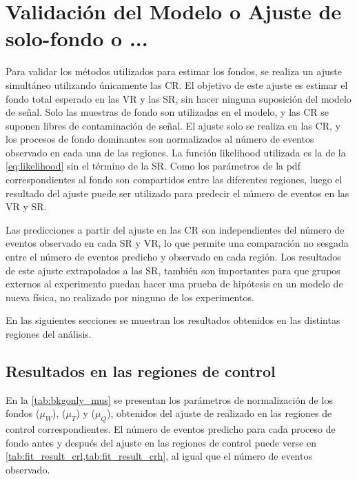 \section{Validación del Modelo o Ajuste de solo-fondo o ...} \label{sec:bkgonlyfit}

Para validar  los métodos utilizados para estimar los
fondos, se realiza un ajuste simultáneo utilizando únicamente las CR.
El objetivo de este ajuste es estimar el fondo total esperado en las VR y las
SR, sin hacer ninguna suposición del modelo de señal. Solo las muestras de fondo
son utilizadas en el modelo, y las CR se suponen libres de contaminación de
señal. El ajuste solo se realiza en las CR, y los procesos de fondo dominantes
son normalizados al número de eventos observado en cada una de las regiones. La
función likelihood utilizada es la de la \cref{eq:likelihood} sin el término de la
SR. Como los parámetros de la pdf correspondientes al fondo son compartidos
entre las diferentes regiones, luego el resultado del ajuste puede ser utilizado para
predecir el número de eventos en las VR y SR.

Las predicciones a partir del ajuste en las CR son independientes del número de
eventos observado en cada SR y VR, lo que permite una comparación no sesgada entre el número de eventos predicho y
observado en cada región.
Los resultados de este ajuste extrapolados a las SR, también son importantes para que
grupos externos al experimento puedan hacer una prueba de hipótesis en un modelo de nueva
física, no realizado por ninguno de los experimentos. %

En las siguientes secciones se muestran los resultados obtenidos
en las distintas regiones del análisis.



\subsection{Resultados en las regiones de control}

En la \cref{tab:bkgonly_mus} se presentan los parámetros de normalización de
los fondos {\wgam} ($\mu_W$), {\ttgam} ($\mu_T$) y {\gjet}
($\mu_Q$), obtenidos del ajuste de realizado en las regiones de control correspondientes.
El número de eventos predicho para cada proceso de fondo antes y después del ajuste en
las regiones de control puede verse en \cref{tab:fit_result_crl,tab:fit_result_crh}, al
igual que el número de eventos observado.


